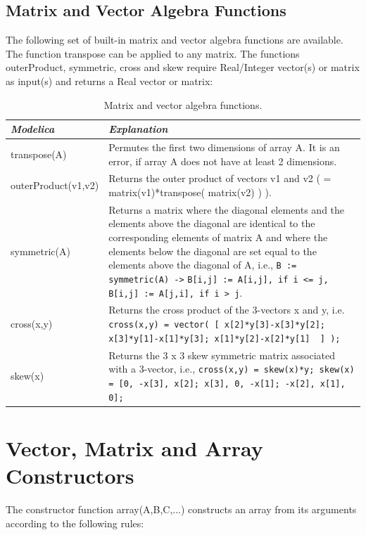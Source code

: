 \documentclass[10pt,a4paper]{report}
\def\doublelabel#1{\label{#1}}
\begin{document}
\subsection{Matrix and Vector Algebra Functions}\doublelabel{matrix-and-vector-algebra-functions}

The following set of built-in matrix and vector algebra functions are
available. The function transpose can be applied to any matrix. The
functions outerProduct, symmetric, cross and skew require Real/Integer
vector(s) or matrix as input(s) and returns a Real vector or matrix:



\begin{longtable}[]{|p{4cm}|p{9cm}|}
\caption{Matrix and vector algebra functions.}\\
\hline
\emph{Modelica} & \emph{Explanation}\\ \hline
\endhead
transpose(A)
& Permutes the first two dimensions of array A. It is an error, if array A
does not have at least 2 dimensions.\\ \hline
outerProduct(v1,v2)
& Returns the outer product of vectors v1 and v2 ( = matrix(v1)*transpose(
matrix(v2) ) ).\\ \hline
symmetric(A)
& Returns a matrix where the diagonal elements and the elements above the
diagonal are identical to the corresponding elements of matrix A and
where the elements below the diagonal are set equal to the elements
above the diagonal of A, i.e., \lstinline!B := symmetric(A) ->!
  \lstinline!B[i,j] := A[i,j], if i <= j, ! \lstinline! B[i,j] := A[j,i], if i > j!.\\ \hline
cross(x,y)
& Returns the cross product of the 3-vectors x and y, i.e.
\lstinline!cross(x,y) = vector( [ x[2]*y[3]-x[3]*y[2];  x[3]*y[1]-x[1]*y[3]; x[1]*y[2]-x[2]*y[1]  ] );!\\ \hline
skew(x)
& Returns the 3 x 3 skew symmetric matrix associated with a 3-vector,
  i.e., \lstinline!cross(x,y) = skew(x)*y; skew(x) = [0, -x[3], x[2]; x[3], 0, -x[1]; -x[2], x[1], 0];!\\ \hline
\end{longtable}

\section{Vector, Matrix and Array Constructors}\doublelabel{vector-matrix-and-array-constructors}

The constructor function array(A,B,C,...) constructs an array from its
arguments according to the following rules:
\end{document}
